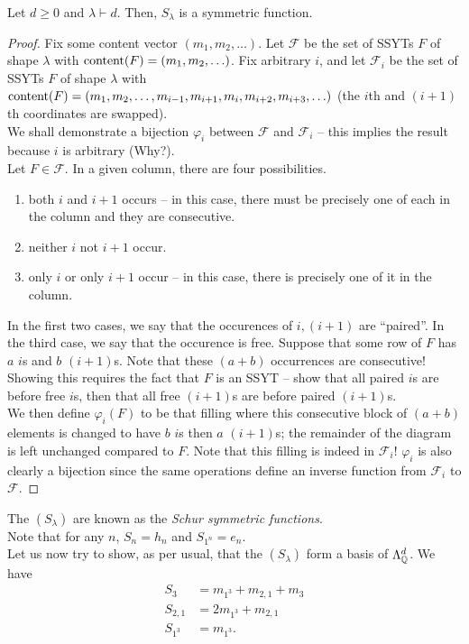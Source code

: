 	\begin{ftheo}
		Let $d \ge 0$ and $\lambda \vdash d$. Then, $S_\lambda$ is a symmetric function.
	\end{ftheo}
	\begin{proof}
		Fix some content vector $(m_1,m_2,\ldots)$. Let $\mathcal{F}$ be the set of SSYTs $F$ of shape $\lambda$ with $\operatorname{content}(F) = (m_1,m_2,\ldots)$. Fix arbitrary $i$, and let $\mathcal{F}_i$ be the set of SSYTs $F$ of shape $\lambda$ with $\operatorname{content}(F) = (m_1,m_2,\ldots,m_{i-1},m_{i+1},m_i,m_{i+2},m_{i+3},\ldots)$ (the $i$th and $(i+1)$th coordinates are swapped).\\
		We shall demonstrate a bijection $\varphi_i$ between $\mathcal{F}$ and $\mathcal{F}_i$ -- this implies the result because $i$ is arbitrary (Why?).\\
		Let $F \in \mathcal{F}$. In a given column, there are four possibilities.
		\begin{enumerate}
			\item both $i$ and $i+1$ occurs -- in this case, there must be precisely one of each in the column and they are consecutive.
			\item neither $i$ not $i+1$ occur.
			\item only $i$ or only $i+1$ occur -- in this case, there is precisely one of it in the column.
		\end{enumerate}
		In the first two cases, we say that the occurences of $i,(i+1)$ are ``paired''. In the third case, we say that the occurence is free. Suppose that some row of $F$ has $a$ $i$s and $b$ $(i+1)$s. Note that these $(a+b)$ occurrences are consecutive! Showing this requires the fact that $F$ is an SSYT -- show that all paired $i$s are before free $i$s, then that all free $(i+1)$s are before paired $(i+1)$s.\\
		We then define $\varphi_i(F)$ to be that filling where this consecutive block of $(a+b)$ elements is changed to have $b$ $i$s then $a$ $(i+1)$s; the remainder of the diagram is left unchanged compared to $F$. Note that this filling is indeed in $\mathcal{F}_i$! $\varphi_i$ is also clearly a bijection since the same operations define an inverse function from $\mathcal{F}_i$ to $\mathcal{F}$.
	\end{proof}

	The $(S_\lambda)$ are known as the \emph{Schur symmetric functions}.\\
	Note that for any $n$, $S_n = h_n$ and $S_{1^n} = e_n$.\\
	Let us now try to show, as per usual, that the $(S_\lambda)$ form a basis of $\Lambda_{\mathbb{Q}}^d$. We have
	\begin{align*}
		S_3 &= m_{1^3} + m_{2,1} + m_3 \\
		S_{2,1} &= 2m_{1^3} + m_{2,1} \\
		S_{1^3} &= m_{1^3}.
	\end{align*}

